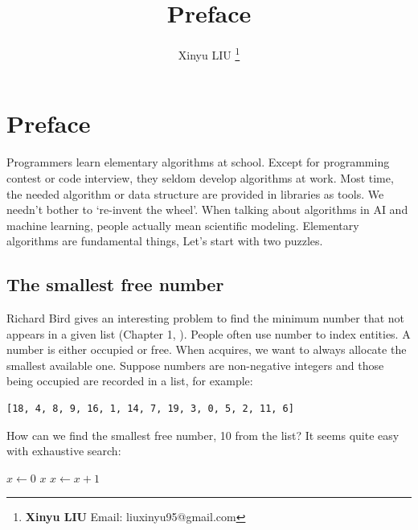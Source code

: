 \documentclass[b5paper]{article}
\begin{document}
\title{Preface}

\author{Xinyu LIU
\thanks{{\bfseries Xinyu LIU} \newline
  Email: liuxinyu95@gmail.com \newline}
  }

\maketitle
\fi


\chapter*{Preface}

Programmers learn elementary algorithms at school. Except for programming contest or code interview, they seldom develop algorithms at work. Most time, the needed algorithm or data structure are provided in libraries as tools. We needn't bother to `re-invent the wheel'. When talking about algorithms in AI and machine learning, people actually mean scientific modeling. Elementary algorithms are fundamental things, Let's start with two puzzles.

\section*{The smallest free number}
\label{min-free} 

Richard Bird gives an interesting problem to find the minimum number that not appears in a given list (Chapter 1, \cite{Bird-book}). People often use number to index entities. A number is either occupied or free. When acquires, we want to always allocate the smallest available one. Suppose numbers are non-negative integers and those being occupied are recorded in a list, for example:

\begin{Verbatim}[fontsize=\footnotesize]
[18, 4, 8, 9, 16, 1, 14, 7, 19, 3, 0, 5, 2, 11, 6]
\end{Verbatim}

How can we find the smallest free number, 10 from the list? It seems quite easy with exhaustive search:

\begin{algorithmic}[1]
  \State $x \gets 0$
  \Loop
      \State \Return $x$
    \Else
      \State $x \gets x + 1$
    \EndIf
  \EndLoop
\EndFunction
\end{algorithmic}
\end{document}
